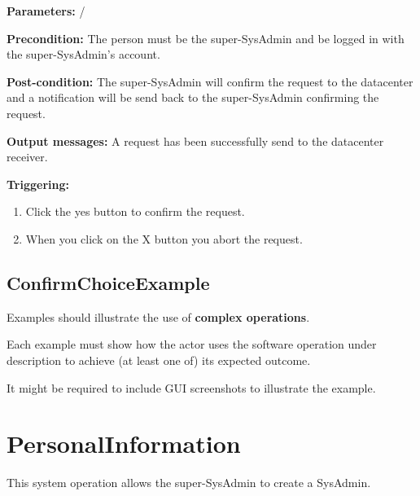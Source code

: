 \begin{description}

\item \textbf{Parameters:} /
\item \textbf{Precondition:} The person must be the super-SysAdmin and be logged
in with the super-SysAdmin's account.
\item \textbf{Post-condition:} The super-SysAdmin will confirm the request to
the datacenter and a notification will be send back to the super-SysAdmin
confirming the request.
\item \textbf{Output messages:} A request has been successfully send to the
datacenter receiver.
\item \textbf{Triggering:} 
\begin{enumerate}
\item Click the yes button to confirm the request.
\item When you click on the X button you abort the request.
\end{enumerate}

 
\end{description}

\subsection{ConfirmChoiceExample}
Examples should illustrate the use of \textbf{complex operations}.

Each example must show how the actor uses the software operation under
description to achieve (at least one of) its expected outcome.

It might be required to include GUI screenshots to illustrate the example.












\section{PersonalInformation}
\label{operation:PersonalInformation}
This system operation allows the super-SysAdmin to create a SysAdmin.

